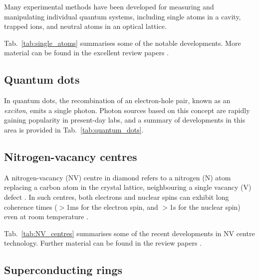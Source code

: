 Many experimental methods have been developed for measuring and manipulating individual quantum systems, including single atoms in a cavity, trapped ions, and neutral atoms in an optical lattice. 

Tab.~\ref{tab:single_atoms} summarises some of the notable developments. More material can be found in the excellent review papers \cite{bib:blatt2008entangled, bib:haroche2006exploring, bib:leibfried2003quantum}.

%
%

\subsection{Quantum dots} 

In quantum dots, the recombination of an electron-hole pair, known as an \textit{exciton}, emits a single photon. Photon sources based on this concept are rapidly gaining popularity in present-day labs, and a summary of developments in this area is provided in Tab.~\ref{tab:quantum_dots}.

%
%

\subsection{Nitrogen-vacancy centres} 

A nitrogen-vacancy (NV) centre in diamond refers to a nitrogen (N) atom replacing a carbon atom in the crystal lattice, neighbouring a single vacancy (V) defect \cite{bib:doherty2013nitrogen}. In such centres, both electrons and nuclear spins can exhibit long coherence times ($>$1ms for the electron spin, and $>$1s for the nuclear spin) even at room temperature \cite{bib:balasubramanian2009ultralong, bib:neumann2010quantum, bib:maurer2012room}.

Tab.~\ref{tab:NV_centres} summarises some of the recent developments in NV centre technology. Further material can be found in the review papers \cite{bib:doherty2013nitrogen, bib:atature2018material, bib:awschalom2018quantum}.

%
%

\subsection{Superconducting rings} 

